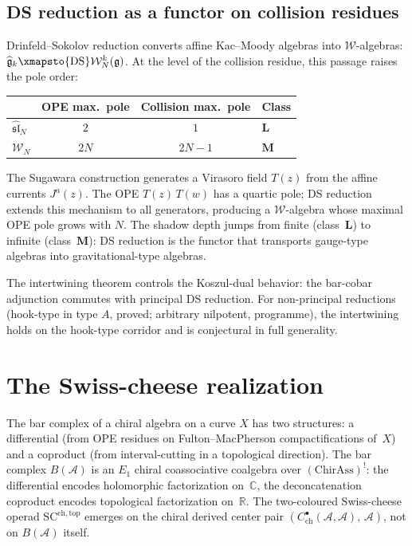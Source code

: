 \documentclass[11pt,reqno]{amsart}
\theoremstyle{definition}
\theoremstyle{remark}
\providecommand{\cA}{\mathcal{A}}
\providecommand{\fg}{\mathfrak{g}}
\numberwithin{equation}{section}
\begin{document}
\subsection{DS reduction as a functor on collision residues}
\label{ssec:ds-reduction}

Drinfeld--Sokolov reduction converts affine Kac--Moody
algebras into $\mathcal{W}$-algebras:
$\widehat{\fg}_k \xmapsto{\mathrm{DS}}
\mathcal{W}_N^k(\fg)$. At the level of the collision
residue, this passage raises the pole order:

\begin{center}
\renewcommand{\arraystretch}{1.2}
\begin{tabular}{lccl}
\toprule
& \textbf{OPE max.\ pole} & \textbf{Collision max.\ pole}
 & \textbf{Class} \\
\midrule
$\widehat{\mathfrak{sl}}_N$ & $2$ & $1$ & $\mathbf{L}$ \\
$\mathcal{W}_N$ & $2N$ & $2N{-}1$ & $\mathbf{M}$ \\
\bottomrule
\end{tabular}
\end{center}

\noindent
The Sugawara construction generates a Virasoro field
$T(z)$ from the affine currents $J^a(z)$. The OPE
$T(z)\,T(w)$ has a quartic pole; DS reduction extends
this mechanism to all generators, producing a
$\mathcal{W}$-algebra whose maximal OPE pole grows with
$N$. The shadow depth jumps from finite (class~$\mathbf{L}$)
to infinite (class~$\mathbf{M}$): DS reduction is the functor
that transports gauge-type algebras into gravitational-type
algebras.

The intertwining theorem controls the Koszul-dual behavior:
the bar-cobar adjunction commutes with principal DS
reduction. For non-principal reductions (hook-type in type
$A$, proved; arbitrary nilpotent, programme), the
intertwining holds on the hook-type corridor and is
conjectural in full generality.


\section{The Swiss-cheese realization}
\label{sec:swiss-cheese}

The bar complex of a chiral algebra on a curve $X$ has two
structures: a differential (from OPE residues on Fulton--MacPherson
compactifications of~$X$) and a coproduct (from interval-cutting
in a topological direction). The bar complex $B(\cA)$ is an $E_1$
chiral coassociative coalgebra over $(\mathrm{ChirAss})^!$: the
differential encodes holomorphic factorization on~$\mathbb{C}$, the
deconcatenation coproduct encodes topological factorization
on~$\mathbb{R}$. The two-coloured Swiss-cheese operad
$\mathrm{SC}^{\mathrm{ch,top}}$ emerges on the chiral derived center
pair $(C^\bullet_{\mathrm{ch}}(\cA,\cA),\, \cA)$, not on $B(\cA)$
itself.
\end{document}
